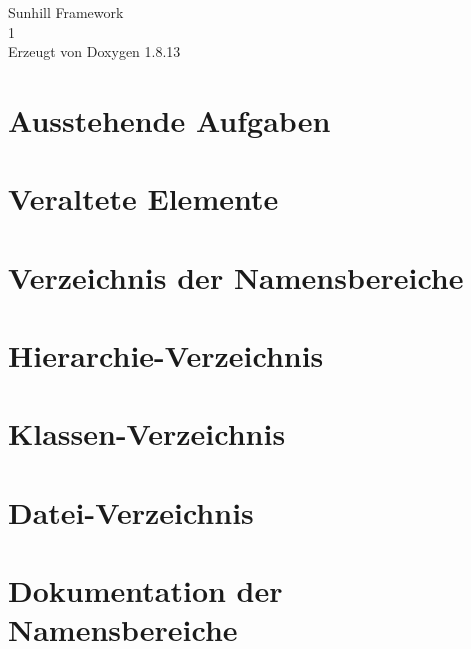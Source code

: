 \documentclass[twoside]{book}
\newcommand{\+}{\discretionary{\mbox{\scriptsize$\hookleftarrow$}}{}{}}
\newcommand{\clearemptydoublepage}{%
  \newpage{\pagestyle{empty}\cleardoublepage}%
}
\begin{document}
\hypersetup{pageanchor=false,
             bookmarksnumbered=true,
             pdfencoding=unicode
            }
\begin{titlepage}
\vspace*{7cm}
\begin{center}%
{\Large Sunhill Framework \\[1ex]\large 1 }\\
\vspace*{1cm}
{\large Erzeugt von Doxygen 1.8.13}\\
\end{center}
\end{titlepage}
\clearemptydoublepage
{}
\tableofcontents
\clearemptydoublepage
{}
\hypersetup{pageanchor=true}

\chapter{Ausstehende Aufgaben}
\label{todo}

\chapter{Veraltete Elemente}
\label{deprecated}

\chapter{Verzeichnis der Namensbereiche}

\chapter{Hierarchie-\/\+Verzeichnis}

\chapter{Klassen-\/\+Verzeichnis}

\chapter{Datei-\/\+Verzeichnis}

\chapter{Dokumentation der Namensbereiche}












\end{document}
